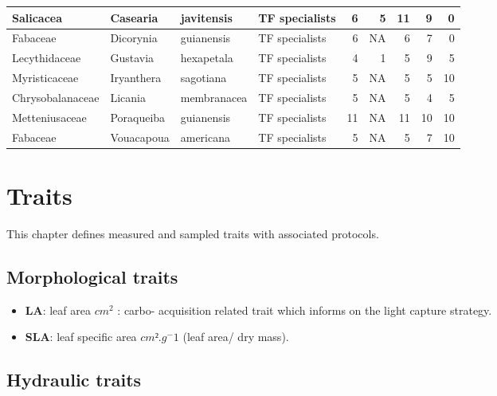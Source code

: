 \documentclass[
]{book}
\providecommand{\tightlist}{%
  \setlength{\itemsep}{0pt}\setlength{\parskip}{0pt}}
\begin{document}
\begin{table}
\begin{tabular}[t]{l|l|l|l|r|r|r|r|r}
\hline
Salicacea & Casearia & javitensis & TF specialists & 6 & 5 & 11 & 9 & 0\\
\hline
Fabaceae & Dicorynia & guianensis & TF specialists & 6 & NA & 6 & 7 & 0\\
\hline
Lecythidaceae & Gustavia & hexapetala & TF specialists & 4 & 1 & 5 & 9 & 5\\
\hline
Myristicaceae & Iryanthera & sagotiana & TF specialists & 5 & NA & 5 & 5 & 10\\
\hline
Chrysobalanaceae & Licania & membranacea & TF specialists & 5 & NA & 5 & 4 & 5\\
\hline
Metteniusaceae & Poraqueiba & guianensis & TF specialists & 11 & NA & 11 & 10 & 10\\
\hline
Fabaceae & Vouacapoua & americana & TF specialists & 5 & NA & 5 & 7 & 10\\
\hline
\end{tabular}
\end{table}

\hypertarget{traits}{%
\chapter{Traits}\label{traits}}

This chapter defines measured and sampled traits with associated protocols.

\hypertarget{morphological-traits}{%
\section{Morphological traits}\label{morphological-traits}}

\begin{itemize}
\tightlist
\item
  \textbf{LA}: leaf area \(cm^{2}\) : carbo- acquisition related trait which informs on the light capture strategy.
\item
  \textbf{SLA}: leaf specific area \(cm².g{^-1}\) (leaf area/ dry mass).
\end{itemize}

\hypertarget{hydraulic-traits}{%
\section{Hydraulic traits}\label{hydraulic-traits}}
\end{document}
